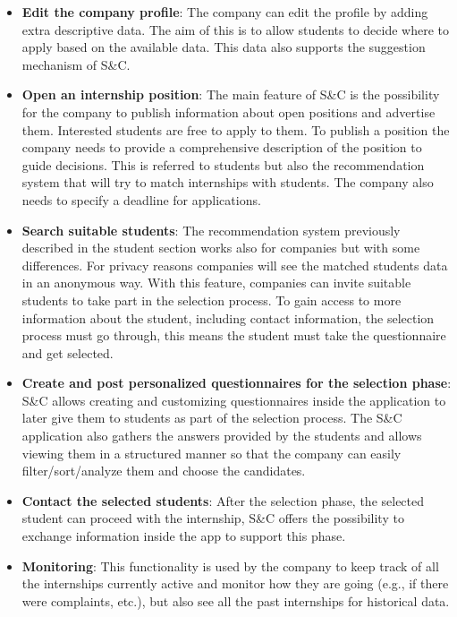 \begin{itemize}
      \item \textbf{Edit the company profile}: The company can edit the profile by adding extra descriptive data. The
            aim of this is to allow students to decide where to apply based on the available data. This data also
            supports the suggestion mechanism of S\&C.
      \item \textbf{Open an internship position}: The main feature of S\&C is the possibility for the company to
            publish information about open positions and advertise them. Interested students are free to apply to them.
            To publish a position the company needs to provide a comprehensive description of the position to guide
            decisions. This is referred to students but also the recommendation system that will try to match
            internships with students. The company also needs to specify a deadline for applications.
      \item \textbf{Search suitable students}: The recommendation system previously described in the student section
            works also for companies but with some differences. For privacy reasons companies will see the matched
            students data in an anonymous way. With this feature, companies can invite suitable students to take part
            in the selection process. To gain access to more information about the student, including contact
            information, the selection process must go through, this means the student must take the questionnaire and
            get selected.
      \item \textbf{Create and post personalized questionnaires for the selection phase}: S\&C allows creating and
            customizing questionnaires inside the application to later give them to students as part of the selection
            process. The S\&C application also gathers the answers provided by the students and allows viewing them in
            a structured manner so that the company can easily filter/sort/analyze them and choose the candidates.
      \item \textbf{Contact the selected students}: After the selection phase, the selected student can proceed with
            the internship, S\&C offers the possibility to exchange information inside the app to support this phase.
      \item \textbf{Monitoring}: This functionality is used by the company to keep track of all the internships
            currently active and monitor how they are going (e.g., if there were complaints, etc.), but also see all
            the past internships for historical data.
\end{itemize}

